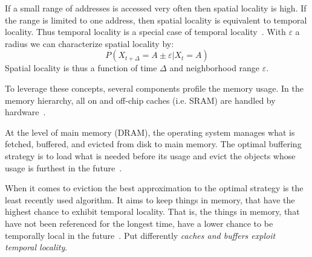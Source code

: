     If a small range of addresses is accessed very often then spatial locality is high.
    If the range is limited to one address, then spatial locality is equivalent to temporal locality. Thus temporal locality is a special case of temporal locality~\autocite{gupta2013locality}.
    With $\varepsilon$ a radius we can characterize spatial locality by:
    \[ P(X_{t + \Delta} = A \pm \varepsilon | X_t = A) \]
    Spatial locality is thus a function of time $\Delta$ and neighborhood range $\varepsilon$. 
    
    To leverage these concepts, several components profile the memory usage.
    In the memory hierarchy, all on and off-chip caches (i.e. SRAM) are handled by hardware~\autocite{jacob2010memory}.
    
    At the level of main memory (DRAM), the operating system manages what is fetched, buffered, and evicted from disk to main memory. 
    The optimal buffering strategy is to load what is needed before its usage and evict the objects whose usage is furthest in the future~\autocite{tanenbaum2015modern}. 
    
    When it comes to eviction the best approximation to the optimal strategy is the least recently used algorithm. 
    It aims to keep things in memory, that have the highest chance to exhibit temporal locality.
    That is, the things in memory, that have not been referenced for the longest time, have a lower chance to be temporally local in the future~\autocite{silberschatz2006operating}.
    Put differently \textit{caches and buffers exploit temporal locality}.
    
